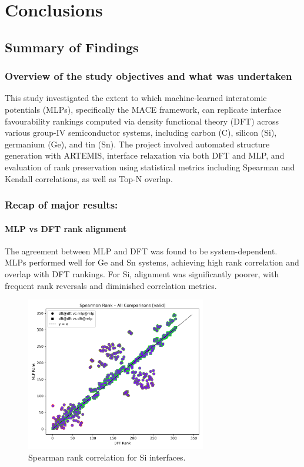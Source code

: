 \chapter{Conclusions}
\label{chapter:conclusions}

\section{Summary of Findings}
\label{section:summary_of_findings}

\subsection{Overview of the study objectives and what was undertaken}

This study investigated the extent to which machine-learned interatomic potentials (MLPs), specifically the MACE
framework, can replicate interface favourability rankings computed via density functional theory (DFT) across various
group-IV semiconductor systems, including carbon (C), silicon (Si), germanium (Ge), and tin (Sn). The project involved
automated structure generation with ARTEMIS, interface relaxation via both DFT and MLP, and evaluation of rank
preservation using statistical metrics including Spearman and Kendall correlations, as well as Top-N overlap.

\subsection{Recap of major results:}

\subsubsection{MLP vs DFT rank alignment}

The agreement between MLP and DFT was found to be system-dependent. MLPs performed well for Ge and Sn systems,
achieving high rank correlation and overlap with DFT rankings. For Si, alignment was significantly poorer, with
frequent rank reversals and diminished correlation metrics.

\begin{figure}[h]
    \centering
    \includegraphics[width=0.7\textwidth]{analysis/plots/results_lower_Si_spearman_all_comparisons_valid.png}
    \caption{Spearman rank correlation for Si interfaces.}
\end{figure}

